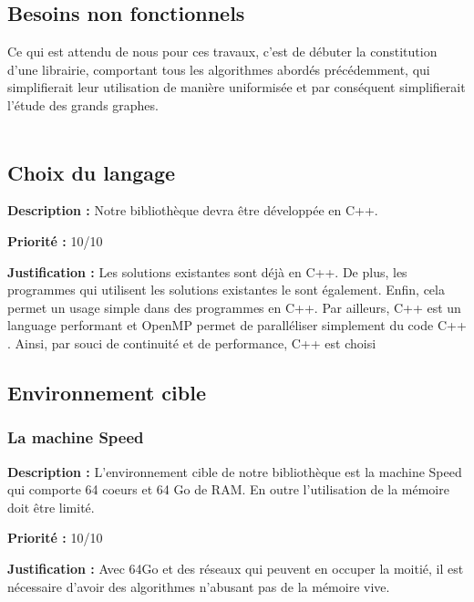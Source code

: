 \begin{titlepage}

\newpage
\begin{center}
\begin{bf}
\section{Besoins non fonctionnels}
\end{bf}
\end{center}

\vspace{1cm}
{
Ce qui est attendu de nous pour ces travaux, c'est de débuter la constitution d'une librairie, comportant tous les algorithmes abordés précédemment, qui simplifierait leur utilisation de manière uniformisée et par conséquent simplifierait l'étude des grands graphes.
\\ \\ 
}

\subsection{Choix du langage}
{
\textbf{Description :} Notre bibliothèque devra être développée en C++.

\textbf{Priorité :} 10/10

\textbf{Justification :} Les solutions existantes sont déjà en C++. De plus, les programmes qui utilisent les solutions existantes le sont également. Enfin, cela permet un usage simple dans des programmes en C++. Par ailleurs, C++ est un language performant et OpenMP permet de paralléliser simplement du code C++ . Ainsi, par souci de continuité et de performance, C++ est choisi
}

\subsection{Environnement cible}
\subsubsection{La machine Speed}
{
\textbf{Description :} L'environnement cible de notre bibliothèque est la machine Speed qui comporte 64 coeurs et 64 Go de RAM. En outre l'utilisation de la mémoire doit être limité.

\textbf{Priorité :} 10/10

\textbf{Justification :} Avec 64Go et des réseaux qui peuvent en occuper la moitié, il est nécessaire d'avoir des algorithmes n'abusant pas de la mémoire vive.
}


\end{titlepage}
